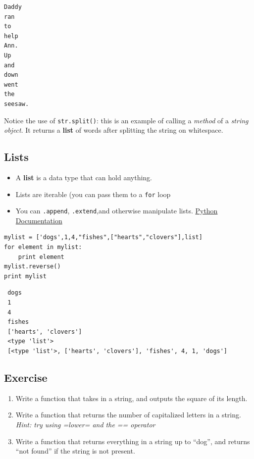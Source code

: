\documentclass[11pt]{article}
\begin{document}
\begin{verbatim}
Daddy
ran
to
help
Ann.
Up
and
down
went
the
seesaw.
\end{verbatim}

    Notice the use of \texttt{str.split()}: this is an example of calling a
    \emph{method} of a \emph{string object}.  It returns a \textbf{list} of words after
    splitting the string on whitespace.
\subsection{Lists}
\label{sec-2-5}


\begin{itemize}
\item A \textbf{list} is a data type that can hold anything.
\item Lists are iterable (you can pass them to a \texttt{for} loop
\item You can \texttt{.append}, \texttt{.extend},and otherwise manipulate lists.  \href{http://docs.python.org/tutorial/datastructures.html}{Python Documentation}
\end{itemize}


\begin{verbatim}
mylist = ['dogs',1,4,"fishes",["hearts","clovers"],list]  
for element in mylist:
    print element    
mylist.reverse()
print mylist
\end{verbatim}

\begin{verbatim}
 dogs
 1
 4
 fishes
 ['hearts', 'clovers']
 <type 'list'>
 [<type 'list'>, ['hearts', 'clovers'], 'fishes', 4, 1, 'dogs']
\end{verbatim}
\subsection{Exercise}
\label{sec-2-6}

\begin{enumerate}
\item Write a function that takes in a string, and outputs the square of
   its length.
\item Write a function that returns the number of capitalized letters in
   a string. \emph{Hint: try using =lower= and the == operator}
\item Write a function that returns everything in a string up to ``dog'',
   and returns ``not found'' if the string is not present.
\end{enumerate}
\end{document}
